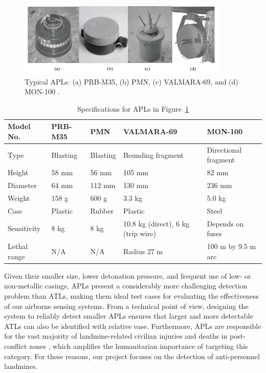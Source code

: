 \begin{figure}[h]
    \centering
    \includegraphics[width=0.9\textwidth]{figs/Huirui/apm_examples.png}
    \caption{Typical APLs: (a) PRB-M35, (b) PMN, (c) VALMARA-69, and (d) MON-100 \cite{paik2002image}.}
    \label{fig:apm_examples}
\end{figure}

\begin{table}[h]
    \centering
    \small
    \caption{Specifications for APLs in Figure~\ref{fig:apm_examples} \cite{paik2002image}}
    \label{tab:apm_specs}
    \begin{tabular}{l p{2.5cm} p{2.5cm} p{3cm} p{3cm}}
        \toprule
        \textbf{Model No.} & \textbf{PRB-M35} & \textbf{PMN} & \textbf{VALMARA-69} & \textbf{MON-100} \\
        \midrule
        Type & Blasting & Blasting & Bounding fragment & Directional fragment \\
        Height & 58 mm & 56 mm & 105 mm & 82 mm \\
        Diameter & 64 mm & 112 mm & 130 mm & 236 mm \\
        Weight & 158 g & 600 g & 3.3 kg & 5.0 kg \\
        Case & Plastic & Rubber & Plastic & Steel \\
        Sensitivity & 8 kg & 8 kg & 10.8 kg (direct), 6 kg (trip wire) & Depends on fuses \\
        Lethal range & N/A & N/A & Radius 27 m & 100 m by 9.5 m arc \\
        \bottomrule
    \end{tabular}
\end{table}

Given their smaller size, lower detonation pressure, and frequent use of low- or non-metallic casings, APLs present a considerably more challenging detection problem than ATLs, making them ideal test cases for evaluating the effectiveness of our airborne sensing systems. From a technical point of view, designing the system to reliably detect smaller APLs ensures that larger and more detectable ATLs can also be identified with relative ease. Furthermore, APLs are responsible for the vast majority of landmine-related civilian injuries and deaths in post-conflict zones \cite{unmas2021handbook}, which amplifies the humanitarian importance of targeting this category. For these reasons, our project focuses on the detection of anti-personnel landmines.
